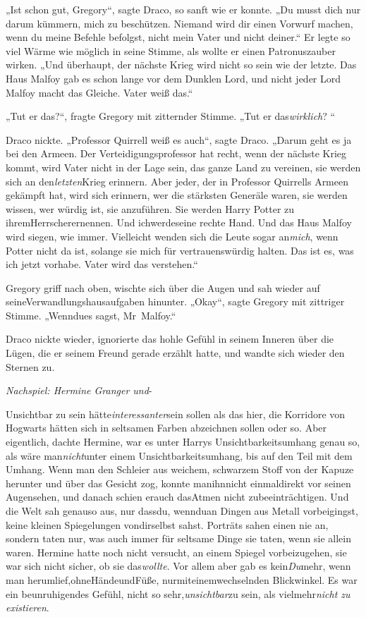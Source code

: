 {„Ist schon gut, Gregory“, sagte Draco, so sanft wie er konnte. „Du musst dich nur darum kümmern, mich zu beschützen. Niemand wird dir einen Vorwurf machen, wenn du meine Befehle befolgst, nicht mein Vater und nicht deiner.“ Er legte so viel Wärme wie möglich in seine Stimme, als wollte er einen Patronuszauber wirken. „Und überhaupt, der nächste Krieg wird nicht so sein wie der letzte. Das Haus Malfoy gab es schon lange vor dem Dunklen Lord, und nicht jeder Lord Malfoy macht das Gleiche. Vater weiß das.“

„Tut er das?“, fragte Gregory mit zitternder Stimme. „Tut er das\emph{wirklich}? “

Draco nickte. „Professor Quirrell weiß es auch“, sagte Draco. „Darum geht es ja bei den Armeen. Der Verteidigungsprofessor hat recht, wenn der nächste Krieg kommt, wird Vater nicht in der Lage sein, das ganze Land zu vereinen, sie werden sich an den\emph{letzten}Krieg erinnern. Aber jeder, der in Professor Quirrells Armeen gekämpft hat, wird sich erinnern, wer die stärksten Generäle waren, sie werden wissen, wer würdig ist, sie anzuführen. Sie werden Harry Potter zu ihremHerrscherernennen. Und ichwerdeseine rechte Hand. Und das Haus Malfoy wird siegen, wie immer. Vielleicht wenden sich die Leute sogar an\emph{mich}, wenn Potter nicht da ist, solange sie mich für vertrauenswürdig halten. Das ist es, was ich jetzt vorhabe. Vater wird das verstehen.“

Gregory griff nach oben, wischte sich über die Augen und sah wieder auf seineVerwandlungshausaufgaben hinunter. „Okay“, sagte Gregory mit zittriger Stimme. „Wenndues sagst, Mr~Malfoy.“

Draco nickte wieder, ignorierte das hohle Gefühl in seinem Inneren über die Lügen, die er seinem Freund gerade erzählt hatte, und wandte sich wieder den Sternen zu.

\emph{Nachspiel: Hermine Granger und}-

Unsichtbar zu sein hätte\emph{interessanter}sein sollen als das hier, die Korridore von Hogwarts hätten sich in seltsamen Farben abzeichnen sollen oder so. Aber eigentlich, dachte Hermine, war es unter Harrys Unsichtbarkeitsumhang genau so, als wäre man\emph{nicht}unter einem Unsichtbarkeitsumhang, bis auf den Teil mit dem Umhang. Wenn man den Schleier aus weichem, schwarzem Stoff von der Kapuze herunter und über das Gesicht zog, konnte manihnnicht einmaldirekt vor seinen Augensehen, und danach schien erauch dasAtmen nicht zubeeinträchtigen. Und die Welt sah genauso aus, nur dassdu, wennduan Dingen aus Metall vorbeigingst, keine kleinen Spiegelungen vondirselbst sahst. Porträts sahen einen nie an, sondern taten nur, was auch immer für seltsame Dinge sie taten, wenn sie allein waren. Hermine hatte noch nicht versucht, an einem Spiegel vorbeizugehen, sie war sich nicht sicher, ob sie das\emph{wollte}. Vor allem aber gab es kein\emph{Du}mehr, wenn man herumlief,ohneHändeundFüße, nurmiteinemwechselnden Blickwinkel. Es war ein beunruhigendes Gefühl, nicht so sehr,\emph{unsichtbar}zu sein, als vielmehr\emph{nicht zu existieren}.

}
